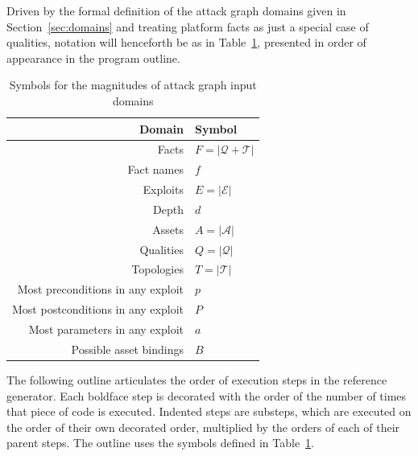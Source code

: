 Driven by the formal definition of the attack graph domains given in 
Section~\ref{sec:domains} and treating platform facts as just a special case
of qualities, notation will henceforth be as in Table~\ref{table:onotation},
presented in order of appearance in the program outline.

\begin{table}
\centering
\begin{tabular}{r|l}
Domain & Symbol \\ \hline
Facts       & $F = |\mathcal{Q}+\mathcal{T}|$ \\
Fact names  & $f$ \\
Exploits    & $E = |\mathcal{E}|$ \\
Depth       & $d$ \\
Assets      & $A = |\mathcal{A}|$ \\
Qualities   & $Q = |\mathcal{Q}|$ \\
Topologies  & $T = |\mathcal{T}|$ \\
Most preconditions in any exploit & $p$ \\
Most postconditions in any exploit & $P$ \\
Most parameters in any exploit & $a$ \\
Possible asset bindings & $B$ \\
\end{tabular}
\caption{Symbols for the magnitudes of attack graph input domains}
\label{table:onotation}
\end{table}

The following outline articulates the order of execution steps in the reference
generator. Each boldface step is decorated with the order of the number of
times that piece of code is executed. Indented steps are substeps, which are
executed on the order of their own decorated order, multiplied by the orders of
each of their parent steps. The outline uses the symbols defined in 
Table~\ref{table:onotation}.

